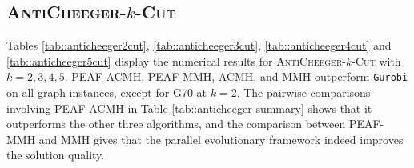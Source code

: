 \documentclass[12pt, a4paper]{article}%
\numberwithin{equation}{section}
\theoremstyle{plain}
\begin{document}
				
				\subsection{\textsc{AntiCheeger}-$k$-\textsc{Cut}}
				\label{sec::result-anticheeger}
				
				Tables \ref{tab::anticheeger2cut}, \ref{tab::anticheeger3cut}, \ref{tab::anticheeger4cut} and \ref{tab::anticheeger5cut} display the numerical results for \textsc{AntiCheeger}-$k$-\textsc{Cut} with $k=2,3,4,5$. {PEAF-ACMH, PEAF-MMH, ACMH, and MMH outperform \texttt{Gurobi} on all graph
instances, except for G70 at $k=2$.}
                The pairwise comparisons involving PEAF-ACMH in Table \ref{tab::anticheeger-summary} shows that it outperforms the other three algorithms, and the comparison between PEAF-MMH and MMH gives that  the parallel evolutionary framework indeed improves the solution quality.
				
				
				
\end{document}
